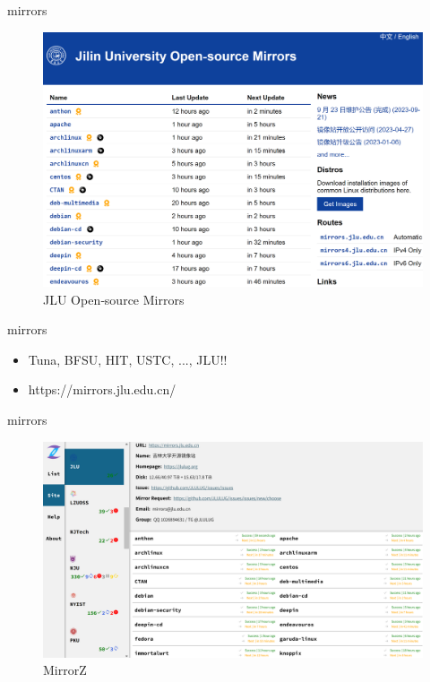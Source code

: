 \documentclass{beamer}
\begin{document}
\begin{frame}{mirrors}
    \begin{figure}[c]
        \centering
        \includegraphics[height=.8\textheight]{pic/mirror.png}
        \caption{JLU Open‑source Mirrors}
    \end{figure}
\end{frame}

\begin{frame}{mirrors}
    \begin{itemize}
        \item Tuna, BFSU, HIT, USTC, ..., JLU!!
        \item https://mirrors.jlu.edu.cn/
    \end{itemize}
\end{frame}

\begin{frame}{mirrors}
    \begin{figure}[c]
        \centering
        \includegraphics[height=.7\textheight]{pic/mirrorz.png}
        \caption{MirrorZ}
    \end{figure}
\end{frame}
\end{document}
